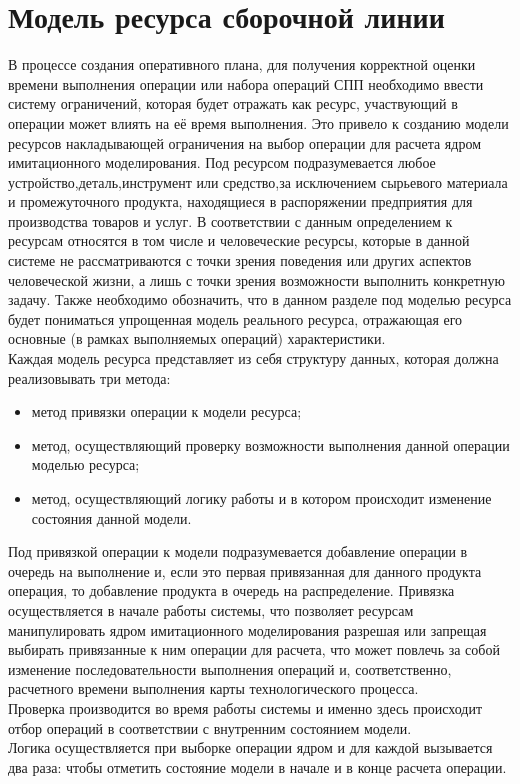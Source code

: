 \section{Модель ресурса сборочной линии}
\indent В процессе создания оперативного плана, для получения корректной оценки времени выполнения операции или набора операций СПП необходимо ввести систему ограничений, которая будет отражать как ресурс, участвующий в операции может влиять на её время выполнения.
Это привело к созданию модели ресурсов накладывающей ограничения на выбор операции для расчета ядром имитационного моделирования.
Под ресурсом подразумевается любое устройство,деталь,инструмент или средство,за исключением сырьевого материала и промежуточного продукта, находящиеся в распоряжении предприятия для производства товаров и услуг.
В соответствии с данным определением к ресурсам относятся в том числе и человеческие ресурсы, которые в данной системе не рассматриваются с точки зрения поведения или других аспектов человеческой жизни, а лишь с точки зрения возможности выполнить конкретную задачу.
Также необходимо обозначить, что в данном разделе под моделью ресурса будет пониматься упрощенная модель реального ресурса, отражающая его основные (в рамках выполняемых операций) характеристики.\\
\indent Каждая модель ресурса представляет из себя структуру данных, которая должна реализовывать три метода:
\begin{itemize}
	\item метод привязки операции к модели ресурса;
	\item метод, осуществляющий проверку возможности выполнения данной операции моделью ресурса;
	\item метод, осуществляющий логику работы и в котором происходит изменение состояния данной модели.
\end{itemize}

\indent Под привязкой операции к модели подразумевается добавление операции в очередь на выполнение и, если это первая привязанная для данного продукта операция, то добавление продукта в очередь на распределение. Привязка осуществляется в начале работы системы, что позволяет ресурсам манипулировать ядром имитационного моделирования разрешая или запрещая выбирать привязанные к ним операции для расчета, что может повлечь за собой изменение последовательности выполнения операций и, соответственно, расчетного времени выполнения карты технологического процесса.\\
\indent Проверка производится во время работы системы и именно здесь происходит отбор операций в соответствии с внутренним состоянием модели.\\
\indent Логика осуществляется при выборке операции ядром и для каждой вызывается два раза: чтобы отметить состояние модели в начале и в конце расчета операции.\\

